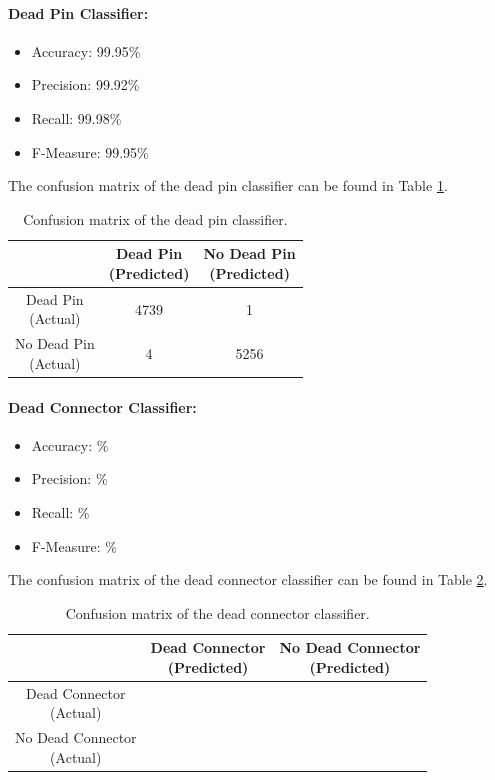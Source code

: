 \paragraph{Dead Pin Classifier:}
\begin{itemize}
  \item Accuracy: 99.95\%
  \item Precision: 99.92\%
  \item Recall: 99.98\%
  \item F-Measure: 99.95\%
\end{itemize}
The confusion matrix of the dead pin classifier can be found in Table
\ref{tbl:confusion-pin}.
\begin{table}[h]
  \centering
  \renewcommand\theadfont{\bfseries}
  \begin{tabular}{|c|c|c|}
    \hline
    & \thead{Dead Pin\\(Predicted)} & \thead{No Dead Pin\\(Predicted)} \\
    \hline
    \thead{Dead Pin\\(Actual)} & 4739 & 1\\
    \hline
    \thead{No Dead Pin\\(Actual)} & 4 & 5256\\
    \hline
  \end{tabular}
  \caption{Confusion matrix of the dead pin classifier.}
  \label{tbl:confusion-pin}
\end{table}

\paragraph{Dead Connector Classifier:}
\begin{itemize}
  \item Accuracy: \%
  \item Precision: \%
  \item Recall: \%
  \item F-Measure: \%
\end{itemize}
The confusion matrix of the dead connector classifier can be found in
Table \ref{tbl:confusion-connector}.
\begin{table}[h]
  \centering
  \renewcommand\theadfont{\bfseries}
  \begin{tabular}{|c|c|c|}
    \hline
    & \thead{Dead Connector\\(Predicted)} & \thead{No Dead Connector\\(Predicted)} \\
    \hline
    \thead{Dead Connector\\(Actual)} & & \\
    \hline
    \thead{No Dead Connector\\(Actual)} & & \\
    \hline
  \end{tabular}
  \caption{Confusion matrix of the dead connector classifier.}
  \label{tbl:confusion-connector}
\end{table}

